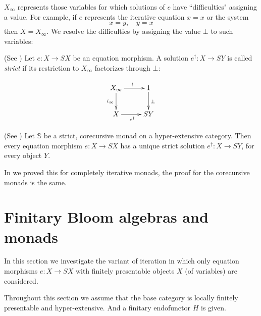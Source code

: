 \documentclass{LMCS}
\theoremstyle{plain}
\theoremstyle{definition}
\numberwithin{equation}{section}
\begin{document}
\begin{rem}
$X_\infty$ represents those variables for which solutions of $e$ have ``difficulties" assigning a value. For example, if $e$ represents the iterative equation $x=x$ or the system $$x=y,\quad y=x$$
then $X=X_\infty$. We resolve the difficulties by assigning the value $\bot$ to such variables:
\end{rem}

\begin{defi}(See \cite{abmv_how})
Let $e:X\rightarrow SX$ be an equation morphism. A solution $e^\dagger:X\rightarrow SY$ is called {\it strict} if its restriction to $X_\infty$ factorizes through $\bot$:

$$ \xymatrix{
 X_\infty\ar[r]^{!}\ar[d]_{i_\infty}&1\ar[d]^{\bot}\\
 X\ar[r]_{e^\dagger}&SY
 } $$
\end{defi}

\begin{thm}{\rm(}See \cite{abmv_how}{\rm)}\label{the_ equations have strict solutions}
Let $\mathbb S$ be a strict, corecursive monad on a hyper-extensive category. Then every equation morphism $e:X\rightarrow SX$ has a unique strict solution $e^\dagger :X\rightarrow SY$, for every object $Y$.

\end{thm}

In \cite{abmv_how} we proved this for completely iterative monads, the proof for the corecursive monads is the same.

\section{Finitary Bloom algebras and monads}

In this section we investigate the variant of iteration in which only equation morphisms $e:X\rightarrow SX$ with finitely presentable objects $X$ (of variables) are considered.


Throughout this section we assume that the base category is locally finitely presentable and hyper-extensive. And a finitary endofunctor $H$ is given.
\end{document}
